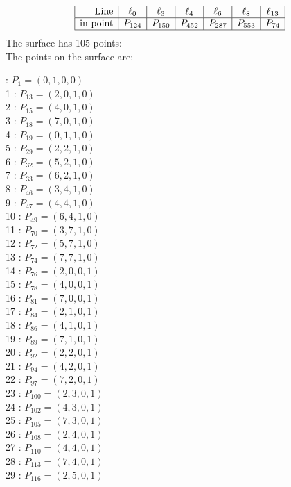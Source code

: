 \documentclass{article}
\begin{document}
{$$\begin{array}{|r*{6}{|c}|}
\mbox{Line}  & \ell_{0} & \ell_{3} & \ell_{4} & \ell_{6} & \ell_{8} & \ell_{13}\\
\hline
\mbox{in point}  & P_{124} & P_{150} & P_{452} & P_{287} & P_{553} & P_{74}\\
\hline
\end{array}
$$
The surface has 105 points:\\
The points on the surface are:\\
\begin{multicols}{3}
 : $P_{1}=( 0, 1, 0, 0 )$\\
1 : $P_{13}=( 2, 0, 1, 0 )$\\
2 : $P_{15}=( 4, 0, 1, 0 )$\\
3 : $P_{18}=( 7, 0, 1, 0 )$\\
4 : $P_{19}=( 0, 1, 1, 0 )$\\
5 : $P_{29}=( 2, 2, 1, 0 )$\\
6 : $P_{32}=( 5, 2, 1, 0 )$\\
7 : $P_{33}=( 6, 2, 1, 0 )$\\
8 : $P_{46}=( 3, 4, 1, 0 )$\\
9 : $P_{47}=( 4, 4, 1, 0 )$\\
10 : $P_{49}=( 6, 4, 1, 0 )$\\
11 : $P_{70}=( 3, 7, 1, 0 )$\\
12 : $P_{72}=( 5, 7, 1, 0 )$\\
13 : $P_{74}=( 7, 7, 1, 0 )$\\
14 : $P_{76}=( 2, 0, 0, 1 )$\\
15 : $P_{78}=( 4, 0, 0, 1 )$\\
16 : $P_{81}=( 7, 0, 0, 1 )$\\
17 : $P_{84}=( 2, 1, 0, 1 )$\\
18 : $P_{86}=( 4, 1, 0, 1 )$\\
19 : $P_{89}=( 7, 1, 0, 1 )$\\
20 : $P_{92}=( 2, 2, 0, 1 )$\\
21 : $P_{94}=( 4, 2, 0, 1 )$\\
22 : $P_{97}=( 7, 2, 0, 1 )$\\
23 : $P_{100}=( 2, 3, 0, 1 )$\\
24 : $P_{102}=( 4, 3, 0, 1 )$\\
25 : $P_{105}=( 7, 3, 0, 1 )$\\
26 : $P_{108}=( 2, 4, 0, 1 )$\\
27 : $P_{110}=( 4, 4, 0, 1 )$\\
28 : $P_{113}=( 7, 4, 0, 1 )$\\
29 : $P_{116}=( 2, 5, 0, 1 )$\\

\end{multicols}}
\end{document}
